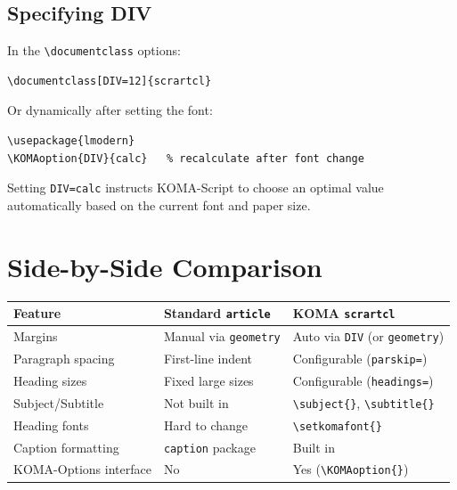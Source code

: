 \documentclass[
    12pt,               %
    a4paper,            %
    parskip=half,       %
    headings=small,     %
    DIV=12              %
]{scrartcl}
\begin{document}
\subsection{Specifying DIV}

In the \verb|\documentclass| options:

\begin{verbatim}
\documentclass[DIV=12]{scrartcl}
\end{verbatim}

Or dynamically after setting the font:

\begin{verbatim}
\usepackage{lmodern}
\KOMAoption{DIV}{calc}   % recalculate after font change
\end{verbatim}

Setting \texttt{DIV=calc} instructs KOMA-Script to choose an optimal value
automatically based on the current font and paper size.


\section{Side-by-Side Comparison}
\label{sec:comparison}

\begin{center}
\begin{tabular}{p{4.5cm}p{4.5cm}p{4.5cm}}
\toprule
\textbf{Feature} & \textbf{Standard \texttt{article}} & \textbf{KOMA \texttt{scrartcl}} \\
\midrule
Margins & Manual via \texttt{geometry} & Auto via \texttt{DIV} (or \texttt{geometry}) \\
Paragraph spacing & First-line indent & Configurable (\texttt{parskip=}) \\
Heading sizes & Fixed large sizes & Configurable (\texttt{headings=}) \\
Subject/Subtitle & Not built in & \verb|\subject{}|, \verb|\subtitle{}| \\
Heading fonts & Hard to change & \verb|\setkomafont{}| \\
Caption formatting & \texttt{caption} package & Built in \\
KOMA-Options interface & No & Yes (\verb|\KOMAoption{}|) \\
\bottomrule
\end{tabular}
\end{center}
\end{document}
